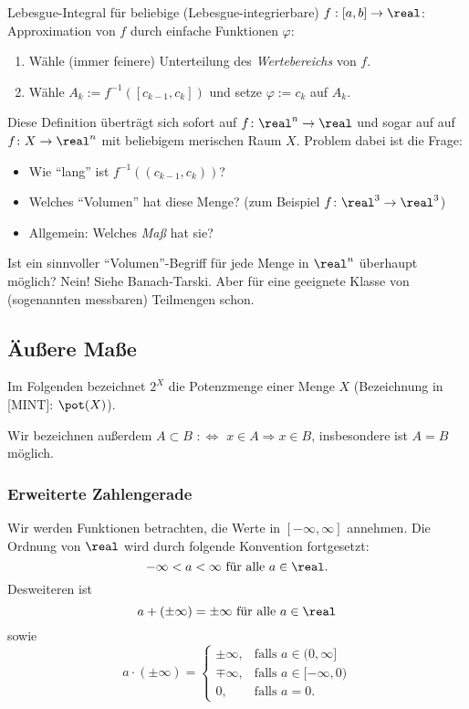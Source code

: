 Lebesgue-Integral für beliebige (Lebesgue-integrierbare) $f:[a,b]\to\real$: Approximation von $f$ durch einfache Funktionen $\varphi$:
\begin{enumerate}
 \item Wähle (immer feinere) Unterteilung des \emph{Wertebereichs} von $f$.
 \item Wähle $A_k := f^{-1}([c_{k-1},c_k])$ und setze $\varphi := c_k$ auf $A_k$.
\end{enumerate}

Diese Definition überträgt sich sofort auf $f\colon\real^n \to \real$ und sogar auf auf $f\colon X \to \real^n$ mit beliebigem merischen Raum $X$. Problem dabei ist die Frage:
\begin{itemize}
 \item Wie ``lang'' ist $f^{-1}((c_{k-1},c_k))$?
 \item Welches ``Volumen'' hat diese Menge? (zum Beispiel $f\colon\real^3 \to \real^3$)
 \item Allgemein: Welches \emph{Maß} hat sie?
\end{itemize}
Ist ein sinnvoller ``Volumen''-Begriff für jede Menge in $\real^n$ überhaupt möglich? Nein! Siehe Banach-Tarski. Aber für eine geeignete Klasse von (sogenannten messbaren) Teilmengen schon.

\subsection{Äußere Maße}
Im Folgenden bezeichnet $2^X$ die Potenzmenge einer Menge $X$ (Bezeichnung in [MINT]: $\pot(X)$).

Wir bezeichnen außerdem $A \subset B$ $:\Leftrightarrow$ $x \in A \Rightarrow x \in B$, insbesondere ist $A = B$ möglich.

\subsubsection{Erweiterte Zahlengerade}
Wir werden Funktionen betrachten, die Werte in $[-\infty, \infty]$ annehmen. Die Ordnung von $\real$ wird durch folgende Konvention fortgesetzt:
\[ - \infty < a < \infty \text{ für alle } a \in \real. \]
Desweiteren ist 
\[ a + (\pm \infty) = \pm \infty \text{ für alle } a \in \real \]
sowie 
\[ a \cdot (\pm \infty) = \begin{cases}
                           \pm \infty, &\text{falls } a \in (0, \infty] \\
                           \mp \infty, &\text{falls } a \in [-\infty, 0) \\
                           0, &\text{falls } a = 0.
                          \end{cases} \]


